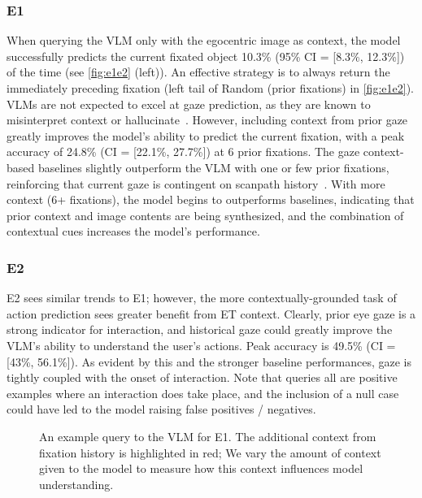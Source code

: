 \subsubsection{E1}

When querying the VLM only with the egocentric image as context, the model successfully predicts the current fixated object 10.3\% (95\% CI = [8.3\%, 12.3\%]) of the time (see \autoref{fig:e1e2} (left)).  An effective strategy is to always return the immediately preceding fixation (left tail of Random (prior fixations) in \autoref{fig:e1e2}).  VLMs are not expected to excel at gaze prediction, as they are known to misinterpret context or hallucinate~\cite{cui_holistic_2023, leng_hallucinations_2024}.  However, including context from prior gaze greatly improves the model's ability to predict the current fixation, with a peak accuracy of 24.8\% (CI = [22.1\%, 27.7\%]) at 6 prior fixations.  The gaze context-based baselines slightly outperform the VLM with one or few prior fixations, reinforcing that current gaze is contingent on scanpath history~\cite{burlingham_laziness_2024, burlingham_scanpaths_2024}.  With more context (6+ fixations), the model begins to outperforms baselines, indicating that prior context and image contents are being synthesized, and the combination of contextual cues increases the model's performance.

\subsubsection{E2}

E2 sees similar trends to E1; however, the more contextually-grounded task of action prediction sees greater benefit from ET context. Clearly, prior eye gaze is a strong indicator for interaction, and historical gaze could greatly improve the VLM's ability to understand the user's actions. Peak accuracy is 49.5\% (CI = [43\%, 56.1\%]). As evident by this and the stronger baseline performances, gaze is tightly coupled with the onset of interaction. Note that queries all are positive examples where an interaction does take place, and the inclusion of a null case could have led to the model raising false positives / negatives.

\begin{figure}[t]
    \centering
    \caption{An example query to the VLM for E1.  The additional context from fixation history is highlighted in red; We vary the amount of context given to the model to measure how this context influences model understanding.}
    \label{fig:query_example}
\end{figure}